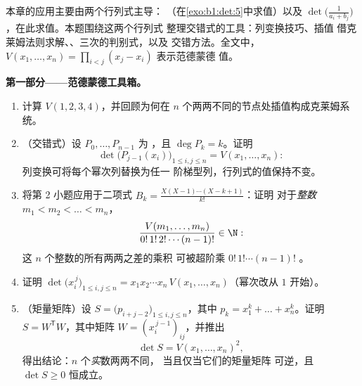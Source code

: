 \begin{problem}\label{pb:b1:det:1}
本章的应用主要由两个行列式主导：
（在\cref{exo:b1:det:5}中求值）以及
\emph{} $\det\bigl(\frac{1}{a_i +
b_j}\bigr)$，在此求值。本题围绕这两个行列式
整理交错式的工具：列变换技巧、插值
借克莱姆法则求解、、三次的判别式，以及
交错方法。全文中，$V(x_1,
\dots, x_n) = \prod_{i < j}(x_j - x_i)$ 表示范德蒙德
值。

\medskip
\noindent\textbf{第一部分——范德蒙德工具箱。}
\begin{enumerate}
  \item 计算 $V(1, 2, 3, 4)$，并回顾为何在
        $n$ 个两两不同的节点处插值构成克莱姆系统。
  \item （交错式）设 $P_0, \dots, P_{n-1}$ 为
        \emph{}，且 $\deg P_k = k$。证明
        \[
        \det\bigl(P_{j-1}(x_i)\bigr)_{1 \leq i, j \leq n}
        = V(x_1, \dots, x_n) :
        \]
        列变换可将每个幂次列替换为任一
        阶梯型列，行列式的值保持不变。
  \item 将第 2 小题应用于二项式 $B_k =
        \frac{X(X-1)\cdots(X-k+1)}{k!}$：证明
        对于\emph{整数} $m_1 < m_2 < \dots < m_n$，
        \[
        \frac{V(m_1, \dots, m_n)}{0!\,1!\,2!\cdots(n-1)!}
        \in \N :
        \]
        这 $n$ 个整数的所有两两之差的乘积
        可被超阶乘 $0!\,1!\cdots(n-1)!$ 。
  \item 证明 $\det\bigl(x_i^{\,j}\bigr)_{1 \leq i, j \leq n} =
        x_1 x_2 \cdots x_n\, V(x_1, \dots, x_n)$（幂次改从
        $1$ 开始）。
  \item （矩量矩阵）设 $S = \bigl(p_{i+j-2}\bigr)_{1 \leq
        i, j \leq n}$，其中 $p_k = x_1^k + \dots + x_n^k$。证明
        $S = W^{\mathsf T} W$，其中矩阵 $W =
        (x_i^{\,j-1})_{ij}$，并推出
        \[
        \det S = V(x_1, \dots, x_n)^2 ,
        \]
        得出结论：$n$ 个\emph{实}数两两不同，
        当且仅当它们的矩量矩阵
        可逆，且 $\det S \geq 0$ 恒成立。
\end{enumerate}


\end{problem}
